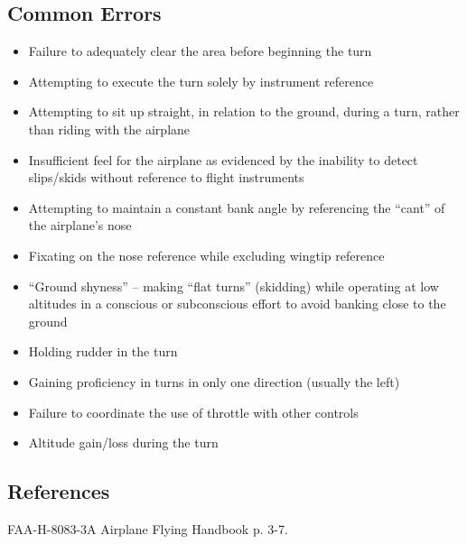 \subsection{Common Errors}

\begin{itemize}
  \item Failure to adequately clear the area before beginning the turn
  \item Attempting to execute the turn solely by instrument reference
  \item Attempting to sit up straight, in relation to the ground, during a
    turn, rather than riding with the airplane
  \item Insufficient feel for the airplane as evidenced by the inability to
    detect slips/skids without reference to flight instruments
  \item Attempting to maintain a constant bank angle by referencing the
    ``cant'' of the airplane's nose
  \item Fixating on the nose reference while excluding wingtip reference
  \item ``Ground shyness'' -- making ``flat turns'' (skidding) while operating
    at low altitudes in a conscious or subconscious effort to avoid banking
    close to the ground
  \item Holding rudder in the turn
  \item Gaining proficiency in turns in only one direction (usually the left)
  \item Failure to coordinate the use of throttle with other controls
  \item Altitude gain/loss during the turn
\end{itemize}

\subsection{References}

FAA-H-8083-3A Airplane Flying Handbook p. 3-7.

